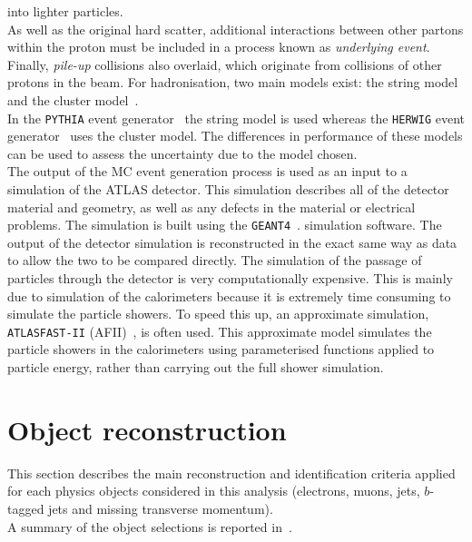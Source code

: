 into lighter particles.\\
As well as the original hard scatter, additional interactions between other partons within the
proton must be included in a process known as \textit{underlying event}.
\newpage
\noindent Finally, \textit{pile-up} collisions also overlaid, which originate from collisions of other
protons in the beam.
For hadronisation, two main models exist: the string model~\cite{string} and the cluster 
model~\cite{cluster}.\\ In the \texttt{PYTHIA} event generator~\cite{pythia} the string model is used 
whereas the \texttt{HERWIG} event generator~\cite{herwig} uses the cluster model. The 
differences in performance of these models can be used to assess the uncertainty due to the 
model chosen.\\
The output of the MC event generation process is used as an input to a simulation of the
ATLAS detector. This simulation describes all of the detector material and geometry, as
well as any defects in the material or electrical problems. The simulation is built using the
\texttt{GEANT4}~\cite{geant}. simulation software.
The output of the detector simulation is reconstructed in the exact same way as data to allow the 
two to be compared directly.
The simulation of the passage of particles through the detector is very computationally expensive.
This is mainly due to simulation of the calorimeters because it is extremely time consuming
to simulate the particle showers. To speed this up, an approximate simulation, 
\texttt{ATLASFAST-II} (AFII)~\cite{afii}, is often used. This approximate model simulates the 
particle showers in the calorimeters using parameterised functions applied to particle energy, 
rather than carrying out the full shower simulation.

\newpage
\section{Object reconstruction}
This section describes the main reconstruction and identification criteria applied for each physics
objects considered in this analysis (electrons, muons, jets, $b$-tagged jets and missing transverse momentum). \\
A summary of the object selections is reported in~.

